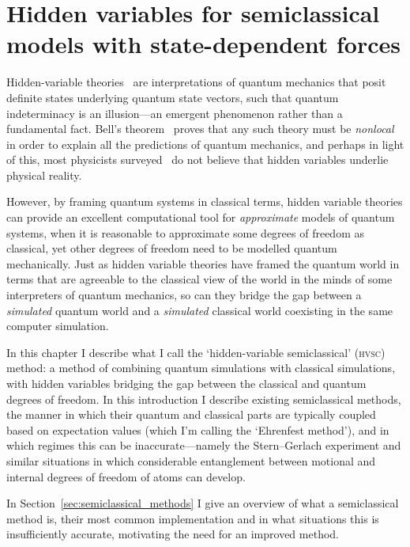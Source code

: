 
\chapter{Hidden variables for semiclassical models with state-dependent forces}

Hidden-variable theories~\cite{GENOVESE2005319, PhysRevA.71.032325} are interpretations of quantum mechanics that posit definite states underlying quantum state vectors, such that quantum indeterminacy is an illusion---an emergent phenomenon rather than a fundamental fact. Bell's theorem~\cite{Bell:111654} proves that any such theory must be \emph{nonlocal} in order to explain all the predictions of quantum mechanics, and perhaps in light of this, most physicists surveyed~\cite{schlosshauer_snapshot_2013} do not believe that hidden variables underlie physical reality.

However, by framing quantum systems in classical terms, hidden variable theories can provide an excellent computational tool for \emph{approximate} models of quantum systems, when it is reasonable to approximate some degrees of freedom as classical, yet other degrees of freedom need to be modelled quantum mechanically. Just as hidden variable theories have framed the quantum world in terms that are agreeable to the classical view of the world in the minds of some interpreters of quantum mechanics, so can they bridge the gap between a \emph{simulated} quantum world and a \emph{simulated} classical world coexisting in the same computer simulation.

In this chapter I describe what I call the `hidden-variable semiclassical' (\textsc{hvsc}) method: a method of combining quantum simulations with classical simulations, with hidden variables bridging the gap between the classical and quantum degrees of freedom. In this introduction I describe existing semiclassical methods, the manner in which their quantum and classical parts are typically coupled based on expectation values (which I'm calling the `Ehrenfest method'), and in which regimes this can be inaccurate---namely the Stern--Gerlach experiment and similar situations in which considerable entanglement between motional and internal degrees of freedom of atoms can develop.

In Section~\ref{sec:semiclassical_methods} I give an overview of what a semiclassical method is, their most common implementation and in what situations this is insufficiently accurate, motivating the need for an improved method.

